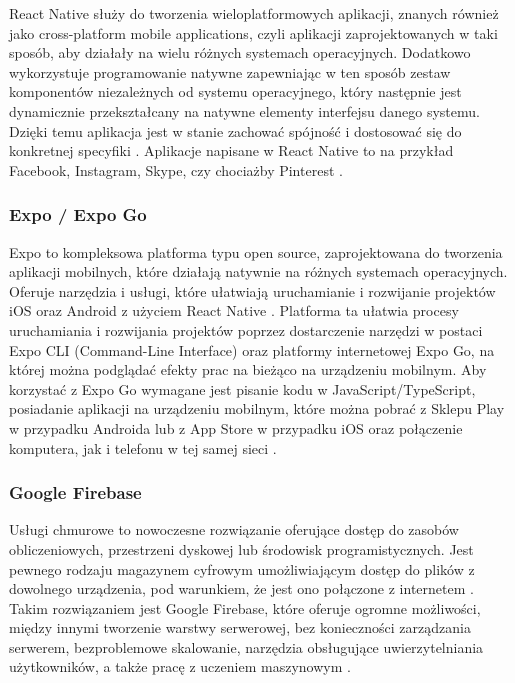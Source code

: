 React Native służy do tworzenia wieloplatformowych aplikacji, znanych również jako cross-platform mobile applications, czyli aplikacji zaprojektowanych w taki sposób, aby działały na wielu różnych systemach operacyjnych. Dodatkowo wykorzystuje programowanie natywne zapewniając w ten sposób zestaw komponentów niezależnych od systemu operacyjnego, który następnie jest dynamicznie przekształcany na natywne elementy interfejsu danego systemu. Dzięki temu aplikacja jest w stanie zachować spójność i dostosować się do konkretnej specyfiki \cite{reactnative}. Aplikacje napisane w React Native to na przykład Facebook, Instagram, Skype, czy chociażby Pinterest \cite{javascripteverywhere}.

\subsubsection*{\textbf{Expo / Expo Go}}
\phantom{Th}
Expo to kompleksowa platforma typu open source, zaprojektowana do tworzenia aplikacji mobilnych, które działają natywnie na różnych systemach operacyjnych. Oferuje narzędzia i usługi, które ułatwiają uruchamianie i rozwijanie projektów iOS oraz Android z użyciem React Native \cite{javascripteverywhere}. Platforma ta ułatwia procesy uruchamiania i rozwijania projektów poprzez dostarczenie narzędzi w postaci Expo CLI (Command-Line Interface) oraz platformy internetowej Expo Go, na której można podglądać efekty prac na bieżąco na urządzeniu mobilnym. Aby korzystać z Expo Go wymagane jest pisanie kodu w JavaScript/TypeScript, posiadanie aplikacji na urządzeniu mobilnym, które można pobrać z Sklepu Play w przypadku Androida lub z App Store w przypadku iOS oraz połączenie komputera, jak i telefonu w tej samej sieci \cite{expogo}.

\subsubsection*{\textbf{Google Firebase}}
\phantom{th}
Usługi chmurowe to nowoczesne rozwiązanie oferujące dostęp do zasobów obliczeniowych, przestrzeni dyskowej lub środowisk programistycznych. Jest pewnego rodzaju magazynem cyfrowym umożliwiającym dostęp do plików z dowolnego urządzenia, pod warunkiem, że jest ono połączone z internetem \cite{cloud}. Takim rozwiązaniem jest Google Firebase, które oferuje ogromne możliwości, między innymi tworzenie warstwy serwerowej, bez konieczności zarządzania serwerem, bezproblemowe skalowanie, narzędzia obsługujące uwierzytelniania użytkowników, a także pracę z uczeniem maszynowym \cite{firebase}.

